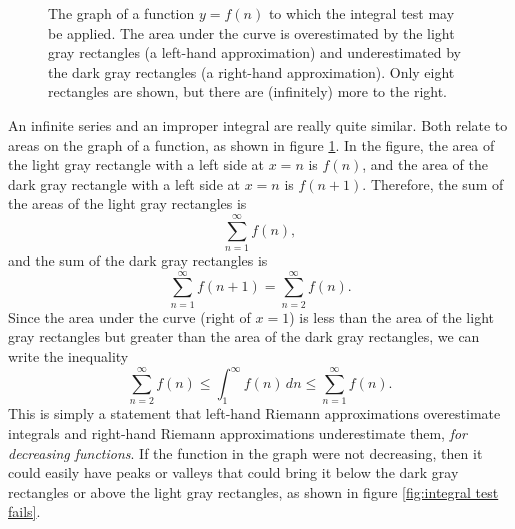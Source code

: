 \documentclass{myarticle}
\theoremstyle{nospace}
\newtheorem{old series theorem}{Theorem}
\newenvironment{series theorem}{\begin{mdframed}\begin{old series theorem}}{\end{old series theorem}\end{mdframed}}
\begin{document}
\begin{figure}[htb!] \centering
{}
\caption{The graph of a function $y = f(n)$ to which the integral test may be applied. The area under the curve is overestimated by the light gray rectangles (a left-hand approximation) and underestimated by the dark gray rectangles (a right-hand approximation). Only eight rectangles are shown, but there are (infinitely) more to the right.}
\label{fig:integral test}
\end{figure}

An infinite series and an improper integral are really quite similar. Both relate to areas on the graph of a function, as shown in figure \ref{fig:integral test}. In the figure, the area of the light gray rectangle with a left side at $x = n$ is $f(n)$, and the area of the dark gray rectangle with a left side at $x = n$ is $f(n + 1)$. Therefore, the sum of the areas of the light gray rectangles is \[ \sum_{n=1}^\infty f(n), \] and the sum of the dark gray rectangles is \[ \sum_{n=1}^\infty f(n+1) = \sum_{n=2}^\infty f(n). \] Since the area under the curve (right of $x = 1$) is less than the area of the light gray rectangles but greater than the area of the dark gray rectangles, we can write the inequality \[ \sum_{n=2}^\infty f(n) \leq \int_1^\infty f(n) \,dn \leq \sum_{n=1}^\infty f(n). \] This is simply a statement that left-hand Riemann approximations overestimate integrals and right-hand Riemann approximations underestimate them, \emph{for decreasing functions}. If the function in the graph were not decreasing, then it could easily have peaks or valleys that could bring it below the dark gray rectangles or above the light gray rectangles, as shown in figure \ref{fig:integral test fails}.
\end{document}
